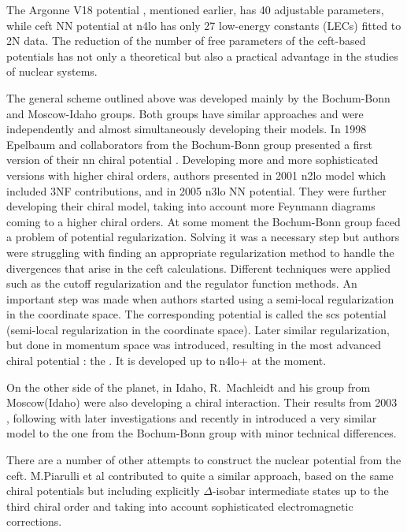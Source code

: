 The Argonne V18 potential \cite{AV18Wiringa}, mentioned earlier, has 40 adjustable parameters,
while \gls{ceft} NN potential at \gls{n4lo} \cite{Machleidt2011} has only 27 low-energy constants (LECs) fitted to 2N data.
The reduction of the number of free parameters of the \gls{ceft}-based potentials
has not only a theoretical but also a practical advantage in the studies of nuclear systems.

The general scheme outlined above was developed mainly by the Bochum-Bonn and Moscow-Idaho groups.
Both groups have similar approaches and were independently and almost simultaneously
developing their models. In 1998 Epelbaum and collaborators from the Bochum-Bonn group 
presented a first version of their \gls{nn} chiral potential \cite{EPELBAOUM1998107, epelbaum2000two}.
Developing more and more sophisticated versions with higher chiral orders, authors presented
in 2001 \cite{epelbaum_physrevc_2002} \gls{n2lo} model which included 3NF contributions,
and in 2005 \cite{epelbaum2005two} \gls{n3lo} NN potential.
They were further developing their chiral model, taking into account more Feynmann diagrams
coming to a higher chiral orders.
At some moment the Bochum-Bonn group faced a problem of potential regularization\cite{skibinski_3H, Witala_2014}.
Solving it was a necessary step but authors
were struggling with finding an appropriate
regularization method to handle the divergences that arise in the \gls{ceft} calculations.
Different techniques were applied such as the cutoff regularization and the regulator function methods.
An important step was made when authors started using a semi-local regularization 
in the coordinate space. The corresponding potential is called the \gls{scs} potential
(semi-local regularization in the coordinate space)\cite{Epelbaum2014SCS}.
Later similar regularization,
but done in momentum space was introduced, resulting in the most advanced chiral potential 
\cite{reinkrebs2018}: the . It is developed up to \gls{n4lo+} at the moment.

On the other side of the planet, in Idaho, R.~Machleidt and his group from Moscow(Idaho) were also developing 
a chiral interaction. Their results from 2003 \cite{Entem2003}, following with later 
investigations \cite{Machleidt2005, Machleidt2010} and recently in \cite{Entem2017}
introduced a very similar model
to the one from the Bochum-Bonn group with minor technical differences.


There are a number of other attempts to construct the nuclear
potential from the \gls{ceft}.
M.Piarulli et al \cite{Piarulli2012,Piarulli2015} contributed
to quite a similar approach, based on
the same chiral potentials but including explicitly 
$\Delta$-isobar intermediate states 
up to the third chiral order and taking into account
sophisticated electromagnetic corrections.

